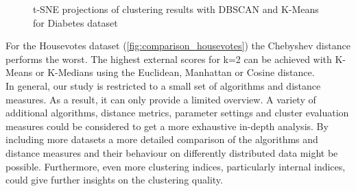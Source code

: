 \begin{figure}[H]
	\caption{t-SNE projections of clustering results with DBSCAN and K-Means for Diabetes dataset}
	\label{fig:diabetestsne}
\end{figure}
 

For the Housevotes dataset (\autoref{fig:comparison_housevotes}) the Chebyshev distance performs the worst. The highest external scores for k=2 can be achieved with K-Means or K-Medians using the Euclidean,  Manhattan or Cosine distance. \\


In general, our study is restricted to a small set of algorithms and distance measures. As a result, it can only provide a limited overview. A variety of additional algorithms, distance metrics, parameter settings and cluster evaluation measures could be considered to get a more exhaustive in-depth analysis. By including more datasets a more detailed comparison of the algorithms and distance measures and their behaviour on differently distributed data might be possible. Furthermore, even more clustering indices, particularly internal indices, could give further insights on the clustering quality. \\

